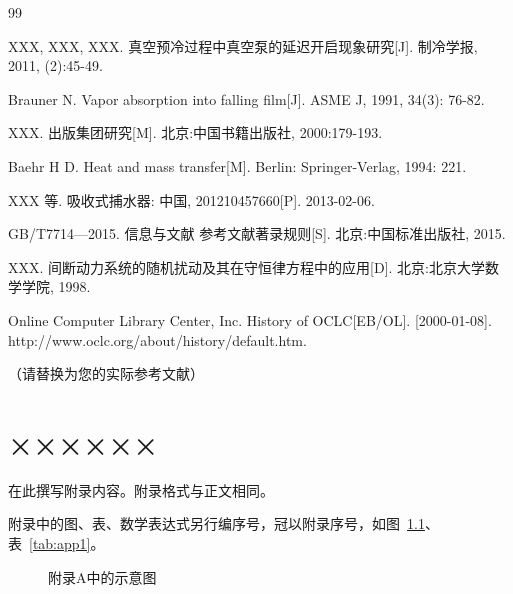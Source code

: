 \documentclass[12pt, a4paper, openany]{ltjbook}
\renewcommand{\chaptermark}[1]{\markboth{第\thechapter 章\quad #1}{}}
\begin{document}
\backmatter

\chaptermark{参考文献}

% 

\begin{thebibliography}{99}
\setlength{\itemsep}{0pt}
\setlength{\parskip}{0pt}
\setlength{\parsep}{0pt}

XXX, XXX, XXX.
真空预冷过程中真空泵的延迟开启现象研究[J].
制冷学报, 2011, (2):45-49.

Brauner N.
Vapor absorption into falling film[J].
ASME J, 1991, 34(3): 76-82.

XXX.
出版集团研究[M].
北京:中国书籍出版社, 2000:179-193.

Baehr H D.
Heat and mass transfer[M].
Berlin: Springer-Verlag, 1994: 221.

XXX 等.
吸收式捕水器: 中国, 201210457660[P].
2013-02-06.

GB/T7714---2015.
信息与文献 参考文献著录规则[S].
北京:中国标准出版社, 2015.

XXX.
间断动力系统的随机扰动及其在守恒律方程中的应用[D].
北京:北京大学数学学院, 1998.

Online Computer Library Center, Inc.
History of OCLC[EB/OL].
[2000-01-08]. http://www.oclc.org/about/history/default.htm.

（请替换为您的实际参考文献）

\end{thebibliography}

\appendix
\chapter{××××××}

在此撰写附录内容。附录格式与正文相同。

附录中的图、表、数学表达式另行编序号，冠以附录序号，如图~\ref{fig:app1}、表~\ref{tab:app1}。

\begin{figure}[htbp]
  \centering
  \caption{附录A中的示意图}
  \label{fig:app1}
\end{figure}
\end{document}
